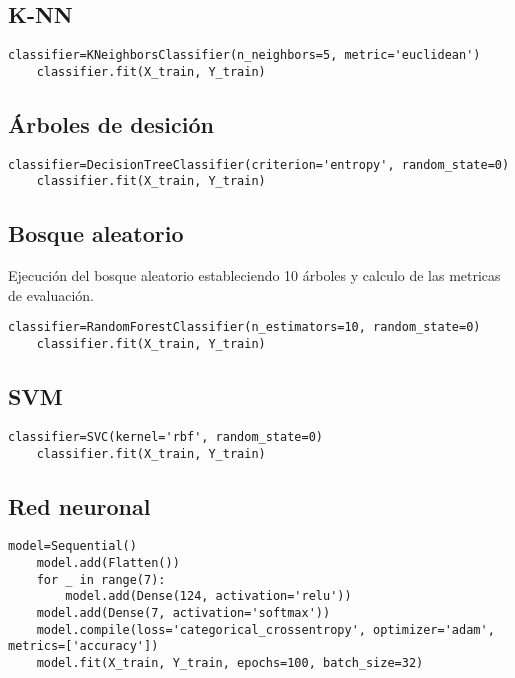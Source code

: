 \documentclass[conference]{IEEEtran}
\begin{document}
\subsection{K-NN}
\begin{lstlisting}[frame=single]
    classifier=KNeighborsClassifier(n_neighbors=5, metric='euclidean')
    classifier.fit(X_train, Y_train)
\end{lstlisting}

\subsection{Árboles de desición}
\begin{lstlisting}[frame=single]
    classifier=DecisionTreeClassifier(criterion='entropy', random_state=0)
    classifier.fit(X_train, Y_train)
\end{lstlisting}

\subsection{Bosque aleatorio}
Ejecución del bosque aleatorio estableciendo 10 árboles y calculo de las metricas de evaluación. 
\begin{lstlisting}[frame=single]
    classifier=RandomForestClassifier(n_estimators=10, random_state=0)
    classifier.fit(X_train, Y_train)
\end{lstlisting}

\subsection{SVM}
\begin{lstlisting}[frame=single]
    classifier=SVC(kernel='rbf', random_state=0)
    classifier.fit(X_train, Y_train)
\end{lstlisting}

\subsection{Red neuronal}
\begin{lstlisting}[frame=single]
    model=Sequential()
    model.add(Flatten())
    for _ in range(7):
        model.add(Dense(124, activation='relu'))
    model.add(Dense(7, activation='softmax'))
    model.compile(loss='categorical_crossentropy', optimizer='adam', 			metrics=['accuracy'])	
    model.fit(X_train, Y_train, epochs=100, batch_size=32)
\end{lstlisting}
\end{document}
